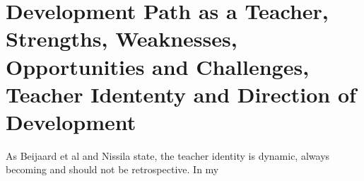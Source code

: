 \section{ Development Path as a Teacher, Strengths, Weaknesses, Opportunities and Challenges, Teacher Idententy and Direction of Development}

As Beijaard et al \cite{Beijaard_2004} and Nissila \cite{nissila_2013} state, the teacher identity is dynamic, always becoming and should not be retrospective. 
In my
  
  
  